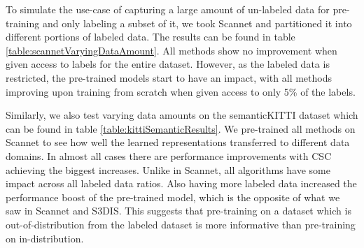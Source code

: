 \documentclass[10pt,twocolumn,letterpaper]{article}
\begin{document}
To simulate the use-case of capturing a large amount of un-labeled data for pre-training and only labeling a subset of it, we took Scannet and partitioned it into different portions of labeled data. The results can be found in table \ref{table:scannetVaryingDataAmount}. All methods show no improvement when given access to labels for the entire dataset. However, as the labeled data is restricted, the pre-trained models start to have an impact, with all methods improving upon training from scratch when given access to only 5\% of the labels.

Similarly, we also test varying data amounts on the semanticKITTI dataset which can be found in table \ref{table:kittiSemanticResults}. We pre-trained all methods on Scannet to see how well the learned representations transferred to different data domains. In almost all cases there are performance improvements with CSC achieving the biggest increases. Unlike in Scannet, all algorithms have some impact across all labeled data ratios. Also having more labeled data increased the performance boost of the pre-trained model, which is the opposite of what we saw in Scannet and S3DIS. This suggests that pre-training on a dataset which is out-of-distribution from the labeled dataset is more informative than pre-training on in-distribution.
\end{document}
